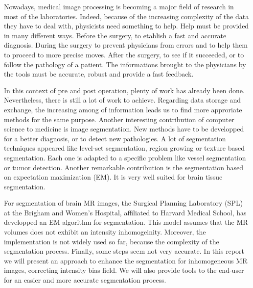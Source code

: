 Nowadays, medical image processing is becoming a major field of research in most of the laboratories. Indeed, because of the increasing complexity of the data they have to deal with,  physicists need something to help. Help must be provided in many different ways. Before the surgery, to etablish a fast and accurate diagnosis. During the surgery to prevent physicians from errors and to help them to proceed to more precise moves. After the surgery, to see if it succeeded, or to follow the pathology of a patient. The informations brought to the physicians by the tools must be accurate, robust and provide a fast feedback.
%
\par
%
In this context of pre and post operation, plenty of work has already been done. Nevertheless, there is still a lot of work to achieve. Regarding data storage and exchange, the increasing among of information leads us to find more approriate methods for the same purpose. Another interesting contribution of computer science to medicine is image segmentation. New methods have to be developped for a better diagnosis, or to detect new pathologies. A lot of segmentation techniques appeared like level-set segmentation, region growing or texture based segmentation. Each one is adapted to a specific problem like vessel segmentation or tumor detection. Another remarkable contribution is the segmentation based on expectation maximization (EM). It is very well suited for brain tissue segmentation. 
%
\par
%
For segmentation of brain MR images, the Surgical Planning Laboratory (SPL) at the Brigham and Women's Hospital, affiliated to Harvard Medical School, has developped an EM algorithm for segmentation. This model assumes that the MR volumes does not exhibit an intensity inhomogeinity. Moreover, the implementation is not widely used so far, because the complexity of the segmentation process. Finally, some steps seem not very accurate. In this report we will present an approach to enhance the segmentation for inhomogeneous MR images, correcting intensity bias field. We will also provide tools to the end-user for an easier and more accurate segmentation process.
%
